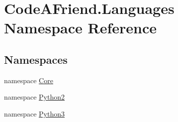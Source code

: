 \hypertarget{namespace_code_a_friend_1_1_languages}{}\section{Code\+A\+Friend.\+Languages Namespace Reference}
\label{namespace_code_a_friend_1_1_languages}
\subsection*{Namespaces}
\begin{DoxyCompactItemize}
\item 
namespace \mbox{\hyperlink{namespace_code_a_friend_1_1_languages_1_1_core}{Core}}
\item 
namespace \mbox{\hyperlink{namespace_code_a_friend_1_1_languages_1_1_python2}{Python2}}
\item 
namespace \mbox{\hyperlink{namespace_code_a_friend_1_1_languages_1_1_python3}{Python3}}
\end{DoxyCompactItemize}
